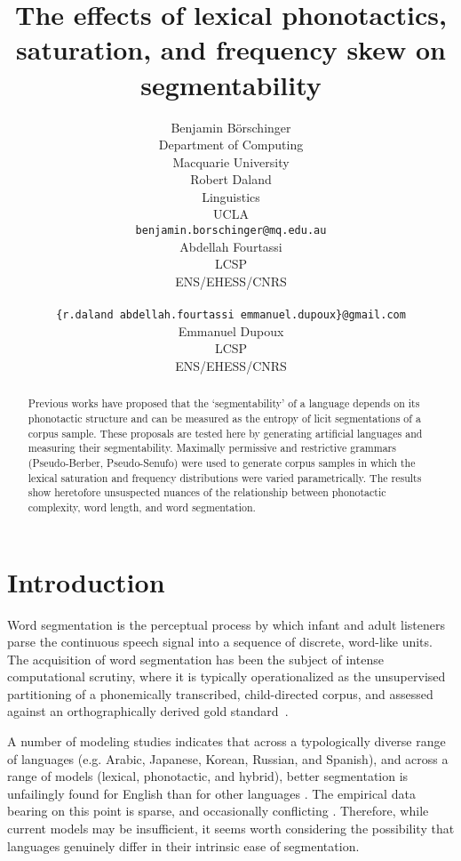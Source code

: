 \documentclass[11pt]{article}
\title{The effects of lexical phonotactics, saturation,
  and frequency skew on segmentability}
\author{Benjamin B{\"o}rschinger \\
    Department of Computing \\
    Macquarie University \\\And
  Robert Daland \\
    Linguistics \\
    UCLA \\
    {\tt benjamin.borschinger@mq.edu.au} \\\And
  Abdellah Fourtassi \\
    LCSP \\
    ENS/EHESS/CNRS \\
    \\
    {\tt \{r.daland\,abdellah.fourtassi\,emmanuel.dupoux\}@gmail.com} \\\And
  Emmanuel Dupoux \\
    LCSP \\
    ENS/EHESS/CNRS }
\date{}
\begin{document}
\maketitle
\begin{abstract}
  Previous works have proposed that the `segmentability' of a language
  depends on its phonotactic structure and can be measured as the
  entropy of licit segmentations of a corpus sample. These proposals
  are tested here by generating artificial languages and measuring
  their segmentability. Maximally permissive and restrictive grammars
  (Pseudo-Berber, Pseudo-Senufo) were used to generate corpus samples 
  in which the lexical saturation and frequency distributions were
  varied parametrically. %
  The results show heretofore  unsuspected nuances of the relationship
  between phonotactic complexity, word length, and word segmentation.
\end{abstract}


\section{Introduction}

Word segmentation is the perceptual process by which infant and adult listeners parse the continuous speech signal into a sequence of discrete, word-like units. The acquisition of word segmentation has been the subject of intense computational scrutiny, where it is typically operationalized as the unsupervised partitioning of a phonemically transcribed, child-directed corpus, and assessed against an orthographically derived gold standard~\cite{Goldwater09a,Daland11a,Pearl10b}.

A number of modeling studies indicates that across a typologically diverse range of languages (e.g. Arabic, Japanese, Korean, Russian, and Spanish), and across a range of models (lexical, phonotactic, and hybrid), better segmentation is unfailingly found for English than for other languages \cite{Fleck08a,Daland09a,Daland11a,Fourtassi13a,Daland13a}. The empirical data bearing on this point is sparse, and occasionally conflicting \cite{Nazzi06a,Nazzi14a}. Therefore, while current models may be insufficient, it seems worth considering the possibility that languages genuinely differ in their intrinsic ease of segmentation.
\end{document}
